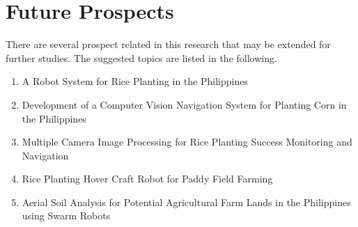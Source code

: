 \section{Future Prospects}

There are several prospect related in this research that may be extended for further studies. The suggested topics are listed in the following.

\begin{enumerate}
	\item	A Robot System for Rice Planting in the Philippines
\item	Development of a Computer Vision Navigation System for Planting Corn in the Philippines
\item	Multiple Camera Image Processing for Rice Planting Success Monitoring and Navigation
\item	Rice Planting Hover Craft Robot for Paddy Field Farming
\item	Aerial Soil Analysis for Potential Agricultural Farm Lands in the Philippines using Swarm Robots

\end{enumerate}


